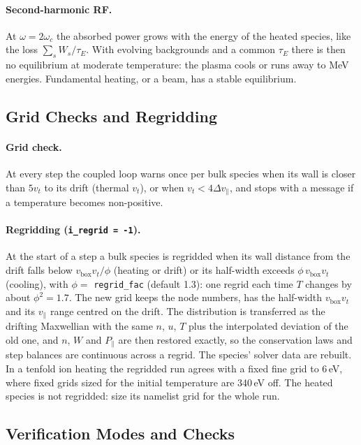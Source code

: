 \documentclass[11pt,a4paper]{article}
\newcommand{\vpa}{v_\parallel}
\begin{document}
\paragraph{Second-harmonic RF.}  At $\omega=2\omega_c$ the absorbed power grows with the energy of the
heated species, like the loss $\sum_sW_s/\tau_E$.  With evolving backgrounds and a common $\tau_E$
there is then no equilibrium at moderate temperature: the plasma cools or runs away to MeV energies.
Fundamental heating, or a beam, has a stable equilibrium.

\subsection{Grid Checks and Regridding}
\label{sec:ms_regrid}

\paragraph{Grid check.}  At every step the coupled loop warns once per bulk species when its wall is
closer than $5v_t$ to its drift (thermal $v_t$), or when $v_t<4\Delta\vpa$, and stops with a message if
a temperature becomes non-positive.

\paragraph{Regridding (\texttt{i\_regrid = -1}).}  At the start of a step a bulk species is
regridded when its wall distance from the drift falls below $v_\mathrm{box}v_t/\phi$ (heating or
drift) or its half-width exceeds $\phi\,v_\mathrm{box}v_t$ (cooling), with
$\phi=$ \texttt{regrid\_fac} (default 1.3): one regrid each time $T$ changes by about $\phi^2=1.7$.
The new grid keeps the node numbers, has the half-width $v_\mathrm{box}v_t$ and its $\vpa$ range
centred on the drift.  The distribution is transferred as the drifting Maxwellian with the same
$n$, $u$, $T$ plus the interpolated deviation of the old one, and $n$, $W$ and $P_\parallel$ are then
restored exactly, so the conservation laws and step balances are continuous across a regrid.  The
species' solver data are rebuilt.  In a tenfold ion heating the regridded run agrees with a fixed
fine grid to 6\,eV, where fixed grids sized for the initial temperature are 340\,eV off.  The heated
species is not regridded: size its namelist grid for the whole run.

\subsection{Verification Modes and Checks}
\label{sec:ms_checks}
\end{document}

